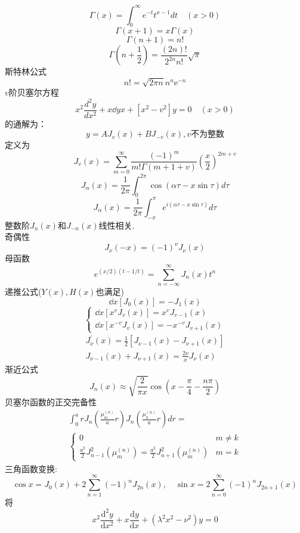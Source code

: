 \documentclass[UTF8,9pt]{ctexart}
\begin{document}
$$\Gamma(x)=\int_{0}^{\infty} e^{-t} t^{x-1} d t \quad(x>0)$$
$$\Gamma(x+1)=x \Gamma(x)$$$$ 
\Gamma(n+1)=n !
$$$$ 
\Gamma\left(n+\frac{1}{2}\right)=\frac{(2 n) !}{2^{2 n} n !} \sqrt{\pi}
$$
斯特林公式
$$ 
n !=\sqrt{2 \pi n} n^{n} \mathrm{e}^{-n}
$$
$v$阶贝塞尔方程$$ 
x^{2} \frac{d^{2} y}{d x^{2}}+x \dd{y}{x}+\left[x^{2}-v^{2}\right] y=0 \quad(x>0)
$$的通解为：$$ 
y=A J_{v}(x)+B J_{-v}(x), v\text{不为整数}
$$
定义为
$$ 
J_{v}(x)=\sum_{m=0}^{\infty} \frac{(-1)^{m}}{m ! \Gamma(m+1+v)}\left(\frac{x}{2}\right)^{2 m+v}
$$
$$ 
J_{\alpha}(x)=\frac{1}{2 \pi} \int_{0}^{2 \pi} \cos (\alpha \tau-x \sin \tau) d \tau
$$
$$ 
J_{\alpha}(x)=\frac{1}{2 \pi} \int_{-\pi}^{\pi} e^{i(\alpha \tau-x \sin \tau)} d \tau
$$
整数阶$J_n(x)$和$J_{-n}(x)$线性相关. \\
奇偶性$$ 
J_{\nu}(-x)=(-1)^{\nu} J_{\nu}(x)
$$
母函数$$ 
e^{(x / 2)(t-1 / t)}=\sum_{n=-\infty}^{\infty} J_{n}(x) t^{n}
$$
递推公式($Y(x),H(x)$也满足)$$ 
\dd{}{x}\left[J_{0}(x)\right]=-J_{1}(x)
$$
$$ 
\left\{\begin{array}{l}{\dd{}{x}\left[x^{v} J_{v}(x)\right]=x^{v} J_{v-1}(x)} \\ {\dd{}{x}\left[x^{-v} J_{v}(x)\right]=-x^{-v} J_{v+1}(x)}\end{array}\right.
$$$$ 
\begin{array}{l}{J_{\nu}^{\prime}(x)=\frac{1}{2}\left[J_{\nu-1}(x)-J_{\nu+1}(x)\right]} \\ {J_{\nu-1}(x)+J_{\nu+1}(x)=\frac{2 \nu}{x} J_{\nu}(x)}\end{array}
$$
渐近公式$$ 
J_{n}(x) \approx \sqrt{\frac{2}{\pi x}} \cos \left(x-\frac{\pi}{4}-\frac{n \pi}{2}\right)
$$贝塞尔函数的正交完备性
$$ \begin{array}{lr}
\int_{0}^{a} r J_{n}\left(\frac{\mu_{m}^{(n)}}{a} r\right) J_{n}\left(\frac{\mu_{k}^{(n)}}{a} r\right) d r=\\
\left\{\begin{array}{lr}
{0} & {m \neq k} \\ 
{\frac{a^{2}}{2} J_{n-1}^{2}\left(\mu_{m}^{(n)}\right)=\frac{a^{2}}{2} J_{n+1}^{2}\left(\mu_{m}^{(n)}\right)} & {m=k}\end{array}\right.
\end{array}$$
三角函数变换:
$$ 
\cos x=J_{0}(x)+2 \sum_{n=1}^{\infty}(-1)^{n} J_{2 n}(x), \quad \sin x=2 \sum_{n=0}^{\infty}(-1)^{n} J_{2 n+1}(x)
$$
将$$ 
x^{2} \frac{\mathrm{d}^{2} y}{\mathrm{d} x^{2}}+x \frac{\mathrm{d} y}{\mathrm{d} x}+\left(\lambda^{2} x^{2}-\nu^{2}\right) y=0
$$
\end{document}
